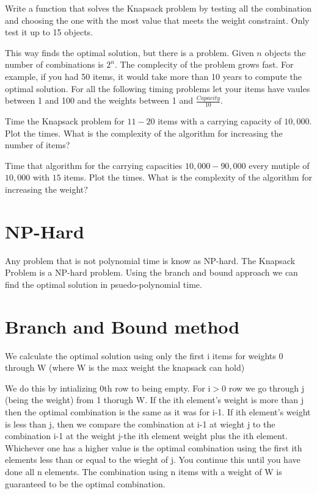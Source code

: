 \begin{problem}
Write a function that solves the Knapsack problem by testing all the combination and choosing the one with the most value that meets the weight constraint. Only test it up to 15 objects.
\end{problem}

This way finds the optimal solution, but there is a problem. Given $n$ objects the number of combinations is $2^n$. The complecity of the problem grows fast. For example, if you had 50 items, it would take more than 10 years to compute the optimal solution. For all the following timing problems let your items have vaules between 1 and 100 and the weights between 1 and $\frac{Capacity}{10}$.

\begin{problem}
Time the Knapsack problem for $11-20$ items with a carrying capacity of $10,000$. Plot the times. What is the complexity of the algorithm for increasing the number of items?
\end{problem}

\begin{problem}
Time that algorithm for the carrying capacities $10,000-90,000$ every mutiple of $10,000$ with $15$ items. Plot the times. What is the complexity of the algorithm for increasing the weight?
\end{problem}

\section*{NP-Hard}

Any problem that is not polynomial time is know as NP-hard. The Knapsack Problem is a NP-hard problem. Using the branch and bound approach we can find the optimal solution in psuedo-polynomial time.

\section*{Branch and Bound method}
We calculate the optimal solution using only the first i items for weights 0 through W (where W is the max weight the knapsack can hold)

We do this by intializing 0th row to being empty.
For i$>$0 row we go through j (being the weight) from 1 thorugh W. If the ith element's weight is more than j then the optimal combination is the same as it was for i-1. If ith element's weight is less than j, then we compare the combination at i-1 at wieght j to the combination i-1 at the weight j-the ith element weight plus the ith element. Whichever one has a higher value is the optimal combination using the first ith elements less than or equal to the wieght of j. You continue this until you have done all n elements. The combination using n items with a weight of W is guaranteed to be the optimal combination.

